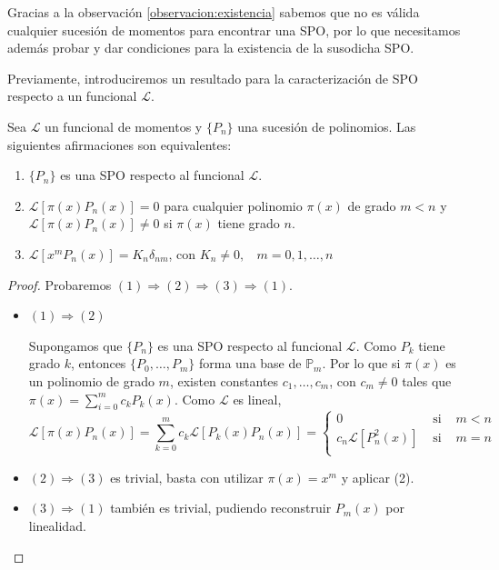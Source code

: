 Gracias a la observación \ref{observacion:existencia} sabemos que no es válida cualquier sucesión de momentos para encontrar una SPO, por lo que necesitamos además probar y dar condiciones para la existencia de la susodicha SPO. 

Previamente, introduciremos un resultado para la caracterización de SPO respecto a un funcional $\mathcal{L}$.

\begin{teorema}
    \label{th:caracterizacion}
Sea $\mathcal{L}$ un funcional de momentos y $\{P_n\}$ una sucesión de polinomios. Las siguientes afirmaciones son equivalentes:
\begin{enumerate}
    \item $\{P_n\}$ es una SPO respecto al funcional $\mathcal{L}$.
    \item $\mathcal{L}[\pi(x)P_n(x)]=0$ para cualquier polinomio $\pi(x)$ de grado $m<n$ y $\mathcal{L}[\pi(x)P_n(x)]\not=0$ si $\pi(x)$ tiene grado $n$.
    \item $\mathcal{L}[x^m P_n(x)]=K_n \delta_{nm}$, con $K_n\not=0, \ \ \ \ m=0,1,\dots,n$
\end{enumerate}
\end{teorema}
\begin{proof}
    Probaremos $(1)\Rightarrow(2)\Rightarrow(3)\Rightarrow(1)$.

    \begin{itemize}
        \item $(1)\Rightarrow(2)$
        
        Supongamos que $\{P_n\}$ es una SPO respecto al funcional $\mathcal{L}$. Como $P_k$ tiene grado $k$, entonces $\{P_0,\dots,P_m\}$ forma una base de $\mathbb P_m$. Por lo que si $\pi(x)$ es un polinomio de grado $m$, existen constantes $c_1,\dots,c_m$, con $c_m\not=0$ tales que $\pi(x)=\sum_{i=0}^m c_k P_k(x)$. Como $\mathcal{L}$ es lineal,
        $$
        \mathcal{L}[\pi(x)P_n(x)]=\sum_{k=0}^m c_k \mathcal{L}[P_k(x) P_n(x)]=\left\lbrace\begin{array}{ccl}
            0 & \text{ si } & m<n \\
            c_n\mathcal{L}[P_n^2(x)] & \text{ si } & m=n \\             
        \end{array}\right.
        $$
        \item $(2)\Rightarrow(3)$ es trivial, basta con utilizar $\pi(x)=x^m$ y aplicar (2).
        \item $(3)\Rightarrow(1)$ también es trivial, pudiendo reconstruir $P_m(x)$ por linealidad. 
    \end{itemize}
\end{proof}

